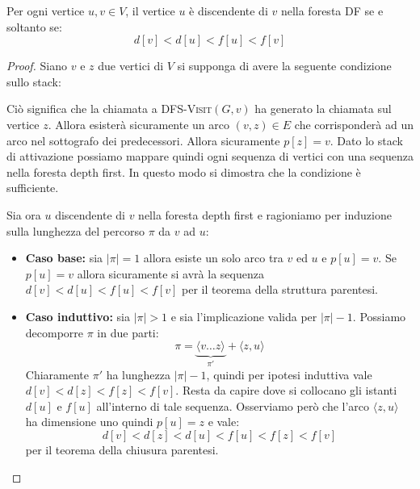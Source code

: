 \begin{corolbox}
	Per ogni vertice $u,v \in V$, il vertice $u$ è discendente di $v$ nella foresta DF se e soltanto se:
	\begin{equation}\label{eq:condizione_discendenza}
		d[v]<d[u]<f[u]<f[v]
	\end{equation}
\end{corolbox}
\begin{proof}
	Siano $v$ e $z$ due vertici di $V$ si supponga di avere la seguente condizione sullo stack:
\begin{center}
\end{center}
Ciò significa che la chiamata a \textsc{DFS-Visit}$(G,v)$ ha generato la chiamata sul vertice $z$. Allora esisterà sicuramente un arco $(v,z) \in E$ che corrisponderà ad un arco nel sottografo dei predecessori. Allora sicuramente $p[z] = v$. Dato lo stack di attivazione possiamo mappare quindi ogni sequenza di vertici con una sequenza nella foresta depth first. In questo modo si dimostra che la condizione è sufficiente.

Sia ora $u$ discendente di $v$ nella foresta depth first e ragioniamo per induzione sulla lunghezza del percorso $\pi$ da $v$ ad $u$:
\begin{itemize}
	\item \textbf{Caso base:} sia $|\pi|=1$ allora esiste un solo arco tra $v$ ed $u$ e $p[u]=v$. Se $p[u]=v$ allora sicuramente si avrà la sequenza $d[v]<d[u]<f[u]<f[v]$ per il teorema della struttura parentesi.
	\item \textbf{Caso induttivo:} sia $|\pi|>1$ e sia l'implicazione valida per $|\pi| -1$. Possiamo decomporre $\pi$ in due parti: $$\pi = \underbrace{\langle v \ldots z \rangle}_{\pi'} + \langle z,u \rangle$$
	Chiaramente $\pi'$ ha lunghezza $|\pi|-1$, quindi per ipotesi induttiva vale $d[v]<d[z]<f[z]<f[v]$. Resta da capire dove si collocano gli istanti $d[u]$ e $f[u]$ all'interno di tale sequenza. Osserviamo però che l'arco $\langle z,u \rangle$ ha dimensione uno quindi $p[u]=z$ e vale:
	\begin{displaymath}
		d[v]<d[z]<d[u]<f[u]<f[z]<f[v]
	\end{displaymath}
	per il teorema della chiusura parentesi.
\end{itemize}
\end{proof}



